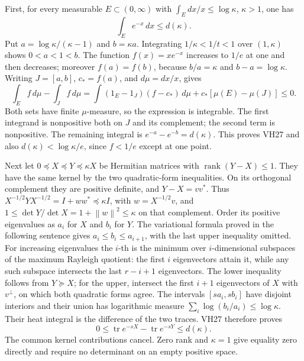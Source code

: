 \documentclass[11pt]{article}
\newcommand{\tr}{\operatorname{tr}}\newcommand{\norm}[1]{\left\lVert#1\right\rVert}
\begin{document}
First, for every measurable \(E\subset(0,\infty)\) with
\(\int_E dx/x\le\log\kappa\), \(\kappa>1\), one has
\begin{equation}\tag{VH27}\label{VH27}
\int_E e^{-x}\,dx\le d(\kappa).
\end{equation}
Put \(a=\log\kappa/(\kappa-1)\) and \(b=\kappa a\).
Integrating \(1/\kappa<1/t<1\) over \((1,\kappa)\) shows
\(0<a<1<b\). The function \(f(x)=xe^{-x}\) increases to \(1/e\)
at one and then decreases; moreover \(f(a)=f(b)\), because
\(b/a=\kappa\) and \(b-a=\log\kappa\).
Writing \(J=[a,b]\), \(c_*=f(a)\), and \(d\mu=dx/x\), gives
\[
\int_E f\,d\mu-\int_J f\,d\mu
=\int(1_E-1_J)(f-c_*)\,d\mu
+c_*[\mu(E)-\mu(J)]\le0.
\]
Both sets have finite \(\mu\)-measure, so the expression is integrable.
The first integrand is nonpositive both on \(J\) and its complement;
the second term is nonpositive. The remaining integral is
\(e^{-a}-e^{-b}=d(\kappa)\). This proves VH27 and also
\(d(\kappa)<\log\kappa/e\), since \(f<1/e\) except at one point.

Next let \(0\preceq X\preceq Y\preceq\kappa X\) be Hermitian
matrices with \(\operatorname{rank}(Y-X)\le1\). They have the same
kernel by the two quadratic-form inequalities. On its orthogonal
complement they are positive definite, and
\(Y-X=vv^*\). Thus
\(X^{-1/2}YX^{-1/2}=I+ww^*\preceq\kappa I\), with
\(w=X^{-1/2}v\), and
\(1\le\det Y/\det X=1+\norm w^2\le\kappa\) on that complement.
Order its positive eigenvalues as \(a_i\) for \(X\) and \(b_i\) for
\(Y\). The variational formula proved in the following sentence gives
\(a_i\le b_i\le a_{i+1}\), with the last upper inequality omitted.
For increasing eigenvalues the \(i\)-th is the minimum over
\(i\)-dimensional subspaces of the maximum Rayleigh quotient: the
first \(i\) eigenvectors attain it, while any such subspace intersects
the last \(r-i+1\) eigenvectors. The lower inequality follows from
\(Y\succeq X\); for the upper, intersect the first \(i+1\) eigenvectors
of \(X\) with \(v^\perp\), on which both quadratic forms agree.
The intervals \([sa_i,sb_i]\) have disjoint interiors and their union
has logarithmic measure \(\sum_i\log(b_i/a_i)\le\log\kappa\).
Their heat integral is the difference of the two traces. VH27 therefore
proves
\begin{equation}\tag{VH28}\label{VH28}
0\le\tr e^{-sX}-\tr e^{-sY}\le d(\kappa).
\end{equation}
The common kernel contributions cancel. Zero rank and \(\kappa=1\)
give equality zero directly and require no determinant on an empty
positive space.
\end{document}
